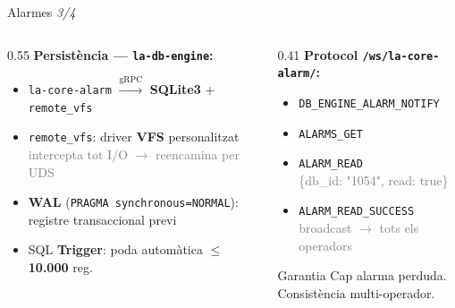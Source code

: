 \begin{frame}{Alarmes \small\textit{3/4}}
  \begin{columns}[T]
    \begin{column}{0.55\textwidth}
      \small
      \textbf{Persistència — \texttt{la-db-engine}:}
      \begin{itemize}
        \item \texttt{la-core-alarm} $\xrightarrow{\text{gRPC}}$ \textbf{SQLite3} + \texttt{remote\_vfs}
        \item \texttt{remote\_vfs}: driver \textbf{VFS} personalitzat\\
              {\footnotesize\textcolor{gray}{intercepta tot I/O $\to$ reencamina per UDS}}
        \item \textbf{WAL} (\texttt{PRAGMA synchronous=NORMAL}):\\
              registre transaccional previ
        \item SQL \textbf{Trigger}: poda automàtica $\leq$ \textbf{10.000} reg.
      \end{itemize}
    \end{column}

    \begin{column}{0.41\textwidth}
      \small
      \textbf{Protocol \texttt{/ws/la-core-alarm/}:}
      \begin{itemize}
        \item[$\leftarrow$] \texttt{DB\_ENGINE\_ALARM\_NOTIFY}
        \item[$\rightarrow$] \texttt{ALARMS\_GET}
        \item[$\rightarrow$] \texttt{ALARM\_READ}\\
          {\footnotesize\textcolor{gray}{\{db\_id: "1054", read: true\}}}
        \item[$\leftarrow$] \texttt{ALARM\_READ\_SUCCESS}\\
          {\footnotesize\textcolor{gray}{broadcast $\to$ tots els operadors}}
      \end{itemize}

      \vspace{0.4em}
      \begin{exampleblock}{\small Garantia}
        \small Cap alarma perduda.\\
        Consistència multi-operador.
      \end{exampleblock}
    \end{column}
  \end{columns}
\end{frame}

